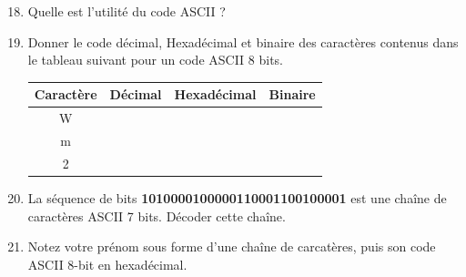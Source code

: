 \documentclass{article}
\begin{document}
\begin{enumerate}
	\setcounter{enumi}{17}
	\item Quelle est l'utilité du code ASCII ?\\
\vspace{1em}
\begin{Form}
	\TextField[name=r18,width=\linewidth,height=2.5em,multiline=true]{}
\end{Form}
	\item Donner le code décimal, Hexadécimal et binaire des caractères contenus dans le tableau suivant pour un code ASCII 8 bits.
\begin{center}
	\begin{Form}
		\begin{tabular}{|c|c|c|c|}
			\hline
			Caractère & Décimal & Hexadécimal & Binaire\\
			\hline
			\hline
			W & \TextField[name=r19d1,width=4em]{} & \TextField[name=r19h1,width=3em]{} & \TextField[name=r19b1,width=8em]{}\\
			\hline
			m & \TextField[name=r19d2,width=4em]{} & \TextField[name=r19h2,width=3em]{} & \TextField[name=r19b2,width=8em]{}\\
			\hline
			2 & \TextField[name=r19d3,width=4em]{} & \TextField[name=r19h3,width=3em]{} & \TextField[name=r19b3,width=8em]{}\\
			\hline
		\end{tabular}
	\end{Form}
\end{center}
	\item La séquence de bits \textbf{\color{red}1010000100000110001100100001} est une chaîne de caractères ASCII 7 bits.
		Décoder cette chaîne.\\
\vspace{1em}
\begin{Form}
	\TextField[name=r20,width=\linewidth,height=2.5em,multiline=true]{}
\end{Form}
	\item Notez votre prénom sous forme d'une chaîne de carcatères, puis son code ASCII 8-bit en hexadécimal.\\
\begin{Form}
	\TextField[name=r21,width=\linewidth,height=2.5em,multiline=true]{}
\end{Form}
\end{enumerate}
\end{document}
